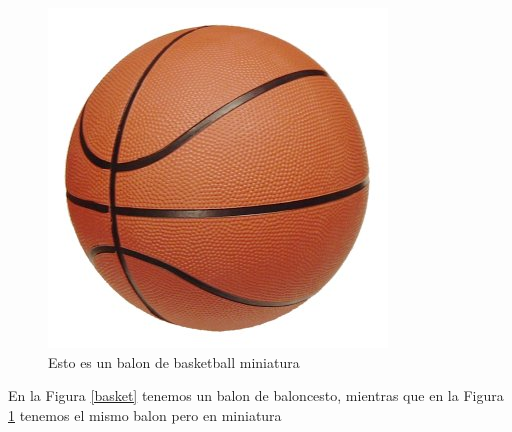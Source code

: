 \begin{figure}[h]
    \begin{flushright}
        \includegraphics[scale=0.1]{imgs/basket/pelota.jpeg}
        \caption{Esto es un balon de basketball miniatura}
        \label{minibasket}
    \end{flushright}
\end{figure}

En la Figura \ref{basket} tenemos un balon de baloncesto, mientras que en la Figura \ref{minibasket} tenemos el mismo balon pero en miniatura
